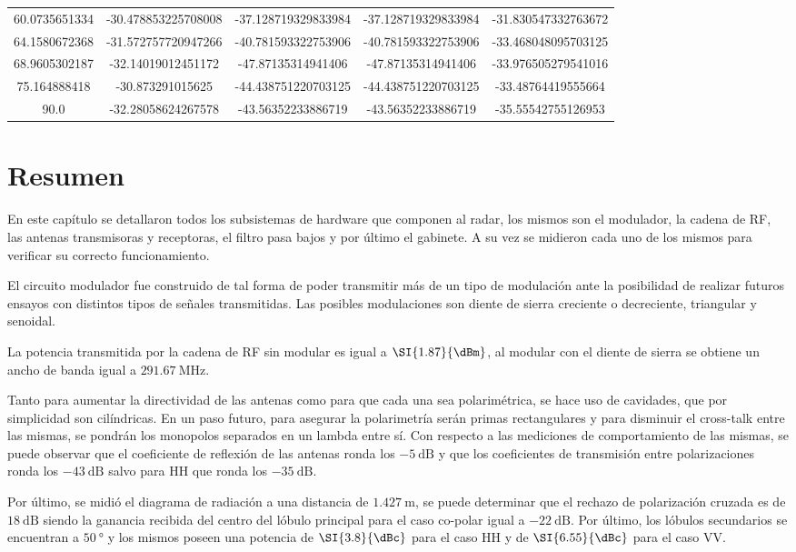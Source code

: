 \begin{table}[H]
\begin{tabular}{*{5}{S[table-auto-round, table-format=-2.2]}}
  60.0735651334 & -30.478853225708008 & -37.128719329833984 & -37.128719329833984 & -31.830547332763672 \tabularnewline

  64.1580672368 & -31.572757720947266 & -40.781593322753906 & -40.781593322753906 & -33.468048095703125 \tabularnewline

  68.9605302187 & -32.14019012451172 & -47.87135314941406 & -47.87135314941406 & -33.976505279541016 \tabularnewline

  75.164888418 & -30.873291015625 & -44.438751220703125 & -44.438751220703125 & -33.48764419555664 \tabularnewline

  90.0 & -32.28058624267578 & -43.56352233886719 & -43.56352233886719 & -35.55542755126953 \tabularnewline
  \bottomrule
  \end{tabular}
\end{table}


\section{Resumen}

En este capítulo se detallaron todos los subsistemas de hardware que componen al radar, los mismos son el modulador, la cadena de RF, las antenas transmisoras y receptoras, el filtro pasa bajos y por último el gabinete. A su vez se midieron cada uno de los mismos para verificar su correcto funcionamiento.

El circuito modulador fue construido de tal forma de poder transmitir más de un tipo de modulación ante la posibilidad de realizar futuros ensayos con distintos tipos de señales transmitidas. Las posibles modulaciones son diente de sierra creciente o decreciente, triangular y senoidal.

La potencia transmitida por la cadena de RF sin modular es igual a $\SI{1.87}{\dBm}$, al modular con el diente de sierra se obtiene un ancho de banda igual a $\SI{291.67}{\MHz}$.

Tanto para aumentar la directividad de las antenas como para que cada una sea polarimétrica, se hace uso de cavidades, que por simplicidad son cilíndricas. En un paso futuro, para asegurar la polarimetría serán primas rectangulares y para disminuir el cross-talk entre las mismas, se pondrán los monopolos separados en un lambda entre sí. Con respecto a las mediciones de comportamiento de las mismas, se puede observar que el coeficiente de reflexión de las antenas ronda los $\SI{-5}{\dB}$ y que los coeficientes de transmisión entre polarizaciones ronda los $\SI{-43}{\dB}$ salvo para HH que ronda los $\SI{-35}{\dB}$.

Por último, se midió el diagrama de radiación a una distancia de $\SI{1.427}{\meter}$, se puede determinar que el rechazo de polarización cruzada es de $\SI{18}{\dB}$ siendo la ganancia recibida del centro del lóbulo principal para el caso co-polar igual a $\SI{-22}{\dB}$. Por último, los lóbulos secundarios se encuentran a $\SI{50}{\degree}$ y los mismos poseen una potencia de $\SI{3.8}{\dBc}$ para el caso HH y de $\SI{6.55}{\dBc}$ para el caso VV.
